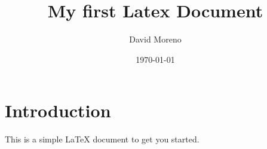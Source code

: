 \documentclass{article}
\title{My first Latex Document}
\author{David Moreno}
\date{\today}
\begin{document}
	
	\maketitle
	
	\section{Introduction}
	This is a simple LaTeX document to get you started.
\end{document}
